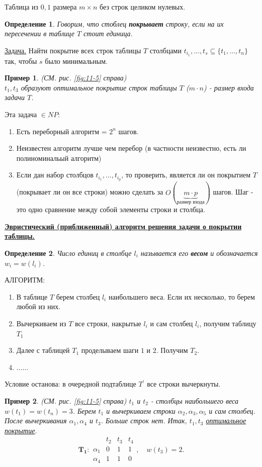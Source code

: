 \documentclass{article}
\newtheorem{example}{Пример}
\newtheorem{definition}{Определение}
\numberwithin{example}{section}
\numberwithin{question}{section}
\numberwithin{Remark}{section}
\numberwithin{theorem}{section}
\numberwithin{definition}{section}
\numberwithin{proposition}{section}
\begin{document}
Таблица из $0,1$ размера $m\times n$ без строк целиком нулевых.
\begin{definition}
	Говорим, что стоблец \textbf{покрывает} строку, если на их пересечении в таблице $T$ стоит единица.
\end{definition} 
\underline{Задача.} Найти покрытие всех строк таблицы $T$ столбцами $t_{i_1},\ldots,t_{s}\subseteq\{t_1,\ldots,t_n\}$ так, чтобы $s$ было минимальным.
\begin{example}(СМ. рис. \ref{fig:11-5} справа)\\
	\label{example-11-1}
	$t_1,t_3$ образуют оптимальное покрытие строк таблицы $T$ ($m\cdot n$) - размер входа задачи $T$.
\end{example}
Эта задача $\in NP$:
\begin{enumerate}
	\item Есть переборный алгоритм = $2^n$ шагов.
	\item Неизвестен алгоритм лучше чем перебор (в частности неизвестно, есть ли полиноминальый алгоритм)
	\item Если дан набор столбцов $t_{i_1},\ldots,t_{i_p}$, то проверить, является ли он покрытием $T$ (покрывает ли он все строки) можно сделать за $O(\underbrace{m\cdot p}_{\text{размер входа}})$ шагов. Шаг - это одно сравнение между собой элементы строки и столбца.
\end{enumerate}
\underline{\textbf{Эвристический (приближенный) алгоритм решения задачи о покрытии таблицы.}}
\begin{definition}
	Число единиц в столбце $l_i$ называется его \textbf{весом} и обозначается $w_i=w(l_i)$.
\end{definition}
АЛГОРИТМ:
\begin{enumerate}
	\item В таблице $T$ берем столбец $l_i$ наибольшего веса. Если их несколько, то берем любой из них.
	\item Вычеркиваем из $T$ все строки, накрытые $l_i$ и сам столбец $l_i$, получим таблицу $T_1$
	\item Далее с таблицей $T_1$ проделываем шаги $1$ и $2$. Получим $T_2$.
	\item $\ldots\ldots$
\end{enumerate}
Условие останова: в очередной подтаблице $T^{'}$ все строки вычеркнуты.
\begin{example}(СМ. рис. \ref{fig:11-5} справа)
\label{example-11-2}
$t_1$ и $t_2$ - столбцы наибольшего веса $w(t_1)=w(t_n)=3$. Берем $t_1$ и вычеркиваем строки $\alpha_2,\alpha_3,\alpha_5$ и сам столбец. После вычеркивания $\alpha_1,\alpha_4$ и $t_3$. Больше строк нет. Итак, $t_1,t_3$ \underline{оптимальное покрытие}.
\begin{displaymath}
\mathbf{T_1} :
 \begin{array}{cccc}
 & t_{2} & t_{3} &t_4 \\
\alpha_{1} & 0 & 1& 1 \\
\alpha_4 & 1 & 1& 0
\end{array} ,\quad w(t_3)=2.
\end{displaymath}
\end{example}
\end{document}
